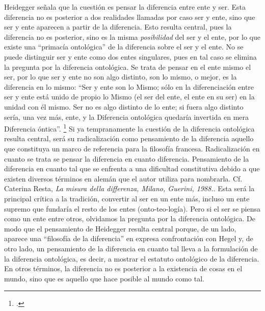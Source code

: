 Heidegger señala que la cuestión es pensar la diferencia entre ente y ser. Esta diferencia no es posterior a dos realidades llamadas por caso ser y ente, sino que ser y ente aparecen a partir de la diferencia. Esto resulta central, pues la diferencia no es posterior, sino es la misma \emph{posibilidad} del ser y el ente, por lo que existe una \enquote{primacía ontológica} de la diferencia sobre el ser y el ente. No se puede distinguir ser y ente como dos entes singulares, pues en tal caso se elimina la pregunta por la diferencia ontológica. Se trata de pensar en el ente mismo el ser, por lo que ser y ente no son algo distinto, son lo mismo, o mejor, es la diferencia en lo mismo: \enquote{Ser y ente son lo Mismo; sólo en la diferenciación entre ser y ente está unido de propio lo Mismo (el ser del ente, el ente en su ser) en la unidad con él mismo. Ser no es algo distinto de lo ente; si fuera algo distinto sería, una vez más, ente, y la Diferencia ontológica quedaría invertida en mera Diferencia óntica}. \footcite[176]{@6966-POGGELER1993} Si ya tempranamente la cuestión de la diferencia ontológica resulta central, será su radicalización como pensamiento de la diferencia aquello que constituya un marco de referencia para la filosofía francesa. Radicalización en cuanto se trata se pensar la diferencia en cuanto diferencia. Pensamiento de la diferencia en cuanto tal que se enfrenta a una dificultad constitutiva debido a que existen diversos términos en alemán que el autor utiliza para nombrarla. Cf. Caterina Resta, \emph{La misura della differenza, Milano, Guerini, 1988.}. Esta será la principal crítica a la tradición, convertir al ser en un ente más, incluso un ente supremo que fundaría el resto de los entes (onto-teo-logía). Pero si el ser se piensa como un ente entre otros, olvidamos la pregunta por la diferencia ontológica. De modo que el pensamiento de Heidegger resulta central porque, de un lado, aparece una \enquote{filosofía de la diferencia} en expresa confrontación con Hegel y, de otro lado, un pensamiento de la diferencia en cuanto tal lleva a la formulación de la diferencia ontológica, es decir, a mostrar el estatuto ontológico de la diferencia. En otros términos, la diferencia no es posterior a la existencia de cosas en el mundo, sino que es aquello que hace posible al mundo como tal.

